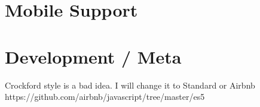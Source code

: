 
\section{Mobile Support}
\section{Development / Meta}
Crockford style is a bad idea. I will change it to Standard or Airbnb https://github.com/airbnb/javascript/tree/master/es5